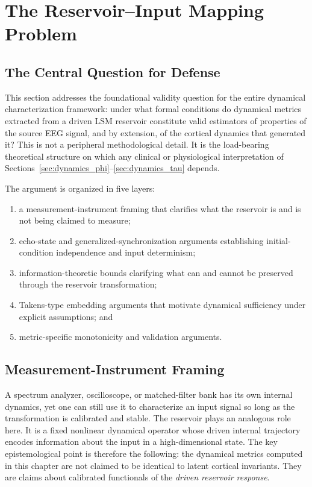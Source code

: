 \section{The Reservoir--Input Mapping Problem}
\label{sec:dynamics_fidelity}

\subsection{The Central Question for Defense}

This section addresses the foundational validity question for the entire dynamical characterization framework: under what formal conditions do dynamical metrics extracted from a driven LSM reservoir constitute valid estimators of properties of the source EEG signal, and by extension, of the cortical dynamics that generated it? This is not a peripheral methodological detail. It is the load-bearing theoretical structure on which any clinical or physiological interpretation of Sections~\ref{sec:dynamics_phi}--\ref{sec:dynamics_tau} depends.

The argument is organized in five layers:
\begin{enumerate}
    \item a measurement-instrument framing that clarifies what the reservoir is and is not being claimed to measure;
    \item echo-state and generalized-synchronization arguments establishing initial-condition independence and input determinism;
    \item information-theoretic bounds clarifying what can and cannot be preserved through the reservoir transformation;
    \item Takens-type embedding arguments that motivate dynamical sufficiency under explicit assumptions; and
    \item metric-specific monotonicity and validation arguments.
\end{enumerate}

\subsection{Measurement-Instrument Framing}

A spectrum analyzer, oscilloscope, or matched-filter bank has its own internal dynamics, yet one can still use it to characterize an input signal so long as the transformation is calibrated and stable. The reservoir plays an analogous role here. It is a fixed nonlinear dynamical operator whose driven internal trajectory encodes information about the input in a high-dimensional state. The key epistemological point is therefore the following: the dynamical metrics computed in this chapter are not claimed to be identical to latent cortical invariants. They are claims about calibrated functionals of the \emph{driven reservoir response}.

